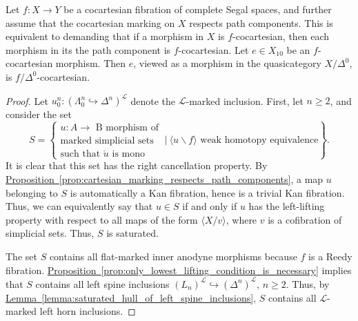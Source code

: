 \documentclass[main.tex]{subfiles}
\begin{document}
\begin{proposition}
  \label{prop:segal_cocartesian_morphisms_are_quasicategory_cocartesian}
  Let $f\colon X \to Y$ be a cocartesian fibration of complete Segal spaces, and further assume that the cocartesian marking on $X$ respects path components. This is equivalent to demanding that if a morphism in $X$ is $f$-cocartesian, then each morphism in its the path component is $f$-cocartesian. Let $e \in X_{10}$ be an $f$-cocartesian morphism. Then $e$, viewed as a morphism in the quasicategory $X / \Delta^{0}$, is $f / \Delta^{0}$-cocartesian.
\end{proposition}
\begin{proof}
  Let $u^{n}_{0}\colon (\Lambda^{n}_{0} \hookrightarrow \Delta^{n})^{\mathcal{L}}$ denote the $\mathcal{L}$-marked inclusion. First, let $n \geq 2$, and consider the set
  \begin{equation*}
    S =
    \left\{
      \substack{
        u\colon A \to \text{ B morphism of} \\
        \text{marked simplicial sets} \\
        \text{such that $\mathring{u}$ is mono}
      }
      \ \bigg| \
      \langle u \backslash f \rangle \text{ weak homotopy equivalence}
    \right\}.
  \end{equation*}
  It is clear that this set has the right cancellation property. By \hyperref[prop:cartesian_marking_respects_path_components]{Proposition~\ref*{prop:cartesian_marking_respects_path_components}}, a map $u$ belonging to $S$ is automatically a Kan fibration, hence is a trivial Kan fibration. Thus, we can equivalently say that $u \in S$ if and only if $u$ has the left-lifting property with respect to all maps of the form $\langle X / v \rangle$, where $v$ is a cofibration of simplicial sets. Thus, $S$ is saturated.

  The set $S$ contains all flat-marked inner anodyne morphisms because $f$ is a Reedy fibration. \hyperref[prop:only_lowest_lifting_condition_is_necessary]{Proposition~\ref*{prop:only_lowest_lifting_condition_is_necessary}} implies that $S$ contains all left spine inclusions $(L_{n})^{\mathcal{L}} \hookrightarrow (\Delta^{n})^{\mathcal{L}}$, $n \geq 2$. Thus, by \hyperref[lemma:saturated_hull_of_left_spine_inclusions]{Lemma~\ref*{lemma:saturated_hull_of_left_spine_inclusions}}, $S$ contains all $\mathcal{L}$-marked left horn inclusions.

\end{proof}
\end{document}
